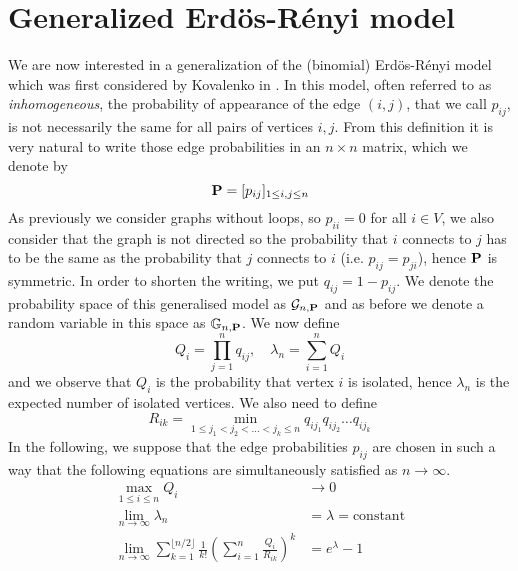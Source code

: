 \section{Generalized Erd\"os-R\'enyi model}
We are now interested in a generalization of the (binomial) Erd\"os-R\'enyi model which was first considered by Kovalenko in \cite{Kovalenko71}.
In this model, often referred to as \emph{inhomogeneous}, the probability of appearance of the edge $(i,j)$, that we call $p_{ij}$, is not necessarily the same for all pairs of vertices $i,j$.
\newline
From this definition it is very natural to write those edge probabilities in an $n\times n$ matrix, which we denote by
\begin{equation}
	\bold{P} = [p_{ij}]_{1\leq i,j \leq n}
\end{equation}
As previously we consider graphs without loops, so $p_{ii} = 0$ for all $i \in V$, we also consider that the graph is not directed so the probability that $i$ connects to $j$ has to be the same as the probability that $j$ connects to $i$ (i.e. $p_{ij} = p_{ji}$), hence $\bold{P}$ is symmetric.
In order to shorten the writing, we put $q_{ij} = 1 - p_{ij}$.
\newline
We denote the probability space of this generalised model as $\mathcal{G}_{n,\bold{P}}$ and as before we denote a random variable in this space as $\mathbb{G}_{n,\bold{P}}$.
\newline
We now define
\begin{equation}
	Q_i = \prod_{j=1}^n q_{ij}, \quad \lambda_n = \sum_{i=1}^nQ_i
\end{equation}
and we observe that $Q_i$ is the probability that vertex $i$ is isolated, hence $\lambda_n$ is the expected number of isolated vertices.
\newline
We also need to define
\begin{equation}
	R_{ik} = \min_{1\leq j_1<j_2< \ldots <j_k\leq n} q_{ij_1}q_{ij_2}\ldots q_{ij_k}
\end{equation}
In the following, we suppose that the edge probabilities $p_{ij}$ are chosen in such a way that the following equations are simultaneously satisfied as $n\to \infty$.
\begin{align}
	\max_{1\leq i \leq n} Q_i &\to 0 \label{eq:C1}\\
	\lim_{n \to \infty} \lambda_n &= \lambda = \text{constant} \label{eq:C2} \\
	\lim_{n\to \infty} \sum_{k=1}^{\lfloor n/2 \rfloor} \frac{1}{k!}(\sum_{i=1}^n \frac{Q_i}{R_{ik}})^k &= e^{\lambda} - 1 \label{eq:C3}
\end{align}
